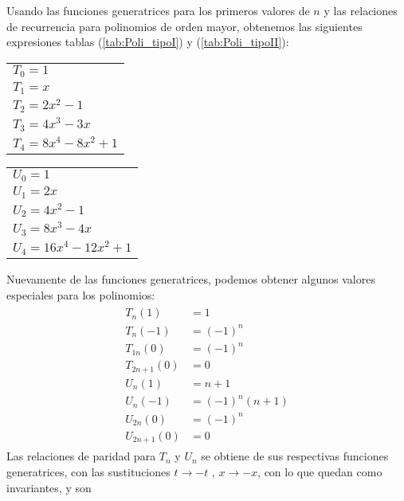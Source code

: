 Usando las funciones generatrices para los primeros valores de $n$ y las relaciones de recurrencia para polinomios de orden mayor, obtenemos las siguientes expresiones tablas (\ref{tab:Poli_tipoI}) y (\ref{tab:Poli_tipoII}):
\\
\begin{center}
\begin{minipage}{5cm}
\begin{tabular}{ l }
\toprule
$T_{0} = 1$ \\
$T_{1} = x$ \\
$T_{2} = 2x^{2} -1$ \\
$T_{3} = 4x^{3} - 3x$ \\
$T_{4} = 8x^{4} - 8x^{2} + 1$ \\
\bottomrule
\end{tabular}
\label{tab:Poli_tipoI}
\end{minipage}
\hspace{2cm}
\begin{minipage}{5cm}
\begin{tabular}{ l }
\toprule
$U_{0} = 1$ \\
$U_{1} = 2x$ \\
$U_{2} = 4x^{2} - 1$ \\
$U_{3} = 8x^{3} - 4x$ \\
$U_{4} = 16x^{4} - 12x^{2} + 1$ \\
\bottomrule
\end{tabular}
\label{tab:Poli_tipoII}
\end{minipage}
\end{center}
Nuevamente de las funciones generatrices, podemos obtener algunos valores especiales para los polinomios:
\begin{eqnarray}
\begin{aligned}
T_{n}(1) &= 1 \\
T_{n}(-1) &= (-1)^{n} \\
T_{1n}(0) &= (-1)^{n} \\
T_{2n+1}(0) &= 0 \\
U_{n}(1) &= n + 1 \\
U_{n}(-1) &= (-1)^{n} (n+1) \\
U_{2n}(0) &= (-1)^{n} \\
U_{2n+1}(0) &= 0
\end{aligned}
\end{eqnarray}
Las relaciones de paridad para $T_{n}$ y $U_{n}$ se obtiene de sus respectivas funciones generatrices, con las sustituciones $t \to -t$ , $x \to -x$, con lo que quedan como invariantes, y son
